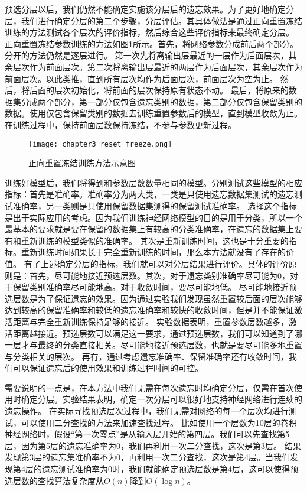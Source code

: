 预选分层以后，我们仍然不能确定实施该分层后的遗忘效果。为了更好地确定分层，我们进行确定分层的第二个步骤，分层评估。其具体做法是通过正向重置冻结训练的方法测试各个层次的评价指标，然后综合这些评价指标来最终确定分层。
正向重置冻结参数训练的方法如图\ref{fig:chapter3_reset_freeze}所示。首先，将网络参数分成前后两个部分。分开的方法仍然是逐层进行。
第一次先将离输出层最近的一层作为后面层次，其余层次作为前面层次。第二次将离输出层最近的两层作为后面层次，其余层次作为前面层次。以此类推，直到所有层次均作为后面层次，前面层次为空为止。
然后，将后面的层次初始化，将前面的层次保持原有状态不动。
最后，将原来的数据集分成两个部分，第一部分仅包含遗忘类别的数据，第二部分仅包含保留类别的数据。使用仅包含保留类别的数据去训练重置参数后的模型，直到模型收敛为止。在训练过程中，保持前面层数保持冻结，不参与参数更新过程。
\begin{figure}
    \centering
    \texttt{[image: chapter3\_reset\_freeze.png]}
    \caption{正向重置冻结训练方法示意图}
    \label{fig:chapter3_reset_freeze}
\end{figure}
训练好模型后，我们将得到和参数层数数量相同的模型。分别测试这些模型的相应指标：首先是准确率。准确率分为两大类，一类是只使用遗忘数据集测试的遗忘测试准确率，另一类则是只使用保留数据集测得的保留测试准确率。
选择这个指标是出于实际应用的考虑。因为我们训练神经网络模型的目的是用于分类，所以一个最基本的要求就是要在保留的数据集上有较高的分类准确率，在遗忘的数据集上要有和重新训练的模型类似的准确率。
其次是重新训练时间，这也是十分重要的指标。重新训练时间如果长于完全重新训练的时间，那么本方法就没有了存在的价值。
有了上述确定分层的指标，我们就可以对分层结果进行评价。具体的评价原则是：首先，尽可能地接近预选层数。其次，对于遗忘类别准确率尽可能为0，对于保留类别准确率尽可能地高。对于收敛时间，要尽可能地低。
尽可能地接近预选层数是为了保证遗忘的效果。因为通过实验我们发现虽然重置较后面的层次能够达到较高的保留准确率和较低的遗忘准确率和较快的收敛时间，但是并不能保证激活距离与完全重新训练保持足够的接近。
实验数据表明，重置参数层数越多，激活距离越接近。预选层数可以满足这一要求，通过预选层数，我们可以知道到了哪一层才与最终的分类直接相关。尽可能地接近预选层数，也就是要尽可能多地重置与分类相关的层次。
再有，通过考虑遗忘准确率、保留准确率还有收敛时间，我们可以保证遗忘后的使用效果和训练过程时间的可控。

需要说明的一点是，在本方法中我们无需在每次遗忘时均确定分层，仅需在首次使用时确定分层。实验结果表明，确定一次分层可以很好地支持神经网络进行连续的遗忘操作。
在实际寻找预选层次过程中，我们无需对网络的每一个层次均进行测试，可以使用二分查找的方法来加速查找过程。
比如使用一个层数为10层的卷积神经网络时，假设“第一次零点”是从输入层开始的第四层。我们可以先查找第5层，因为第5层的遗忘准确率为0，我们再利用一次二分查找，这次是第3层。
结果发现第3层的遗忘集准确率不为0，再利用一次二分查找，这次是第4层。当我们发现第4层的遗忘测试准确率为0时，我们就能确定预选层数是第4层，这可以使得预选层数的查找算法复杂度从$O(n)$降到$O(\log n)$。

